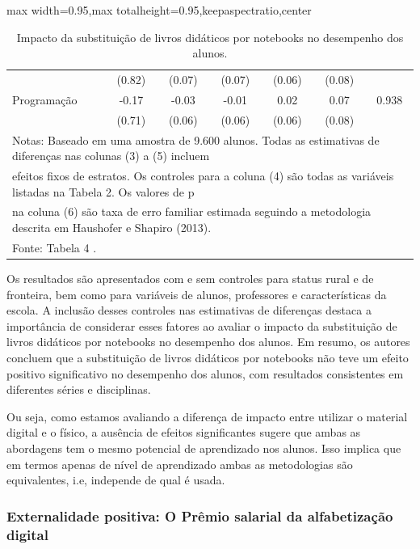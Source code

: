 \documentclass[12pt,letterpaper]{article}
\newcommand{\1}{\mathbbm{1}}
\numberwithin{equation}{section}
\begin{document}
\begin{table}[!htb]
\begin{adjustbox}{max width=0.95\textwidth,max totalheight=0.95\textheight,keepaspectratio,center}
\begin{tabular}{lcccccc}
& (0.82) & (0.07) & (0.07) & (0.06) & (0.08) \\
\hspace{2mm} Programação & -0.17 & -0.03 & -0.01 & 0.02 & 0.07 & 0.938 \\
& (0.71) & (0.06) & (0.06) & (0.06) & (0.08) \\
\hline
\multicolumn{7}{l}{Notas: Baseado em uma amostra de 9.600 alunos. Todas as estimativas de diferenças nas colunas (3) a (5) incluem} \\

\multicolumn{7}{l}{efeitos fixos de estratos. Os controles para a coluna (4) são todas as variáveis listadas na Tabela 2. Os valores de p} \\
\multicolumn{7}{l}{na coluna (6) são taxa de erro familiar estimada seguindo a metodologia descrita em Haushofer e Shapiro (2013).} \\
\multicolumn{7}{l}{Fonte: Tabela 4 \cite{bando2016books}.}
\end{tabular}
\end{adjustbox}
\caption{Impacto da substituição de livros didáticos por notebooks no desempenho dos alunos.} \label{tab:results}
\end{table}

Os resultados são apresentados com e sem controles para status rural e de fronteira, bem como para variáveis de alunos, professores e características da escola. A inclusão desses controles nas estimativas de diferenças destaca a importância de considerar esses fatores ao avaliar o impacto da substituição de livros didáticos por notebooks no desempenho dos alunos. Em resumo, os autores concluem que a substituição de livros didáticos por notebooks não teve um efeito positivo significativo no desempenho dos alunos, com resultados consistentes em diferentes séries e disciplinas. 

Ou seja, como estamos avaliando a diferença de impacto entre utilizar o material digital e o físico, a ausência de efeitos significantes sugere que ambas as abordagens tem o mesmo potencial de aprendizado nos alunos. Isso implica que em termos apenas de nível de aprendizado ambas as metodologias são equivalentes, i.e, independe de qual é usada.  

\subsubsection{Externalidade positiva: O Prêmio salarial da alfabetização digital} \label{sub:ext_wage_premium}
\end{document}
